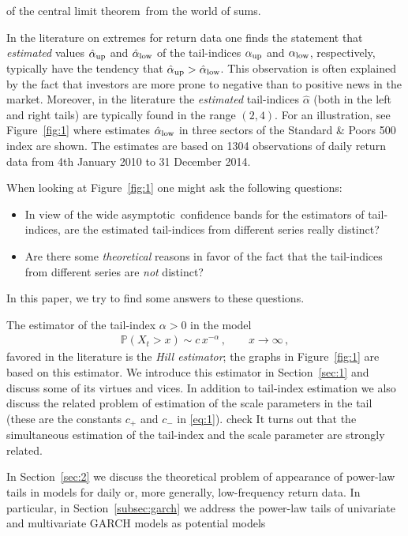 \documentclass[11pt,a4]{amsart}
\newcommand{\red}{\color{darkred}}
\newcommand{\clt}{central limit theorem}
\newcommand{\asy}{asymptotic}
\newcommand{\fre}{frequenc}
\newcommand{\beao}{\begin{eqnarray*}}
\newcommand{\eeao}{\end{eqnarray*}\noindent}
\newcommand{\xto}{x\to\infty}
\renewcommand{\P }{{\mathbb P}}
\newcommand{\1}{{\mathbf 1}}
\begin{document}
of the \clt\ from the world of sums.
\par
In the literature on extremes for return data one finds the 
statement that {\em estimated} values $\hat \alpha_{\rm up}$ and $\hat \alpha_{\rm low}$ 
of the tail-indices $\alpha_{\rm up}$ and $\alpha_{\rm low}$,
respectively, typically have the tendency that $\hat \alpha_{\rm
  up}>\hat \alpha_{\rm low}$. 
This observation is often explained by the fact that investors are
more prone to negative than to positive news in the market. 
Moreover, in the literature the {\em estimated} tail-indices $\hat \alpha$ (both in the left and right tails) 
are typically found in the range $(2,4)$. For an illustration, see
Figure~\ref{fig:1} where estimates $\hat \alpha_{\rm low}$ 
in three sectors of the Standard \& Poors 500 index  are shown. The
estimates are based on 1304 observations of daily return 
data from 4th January 2010 to 31 December 2014.
\par
When looking at Figure~\ref{fig:1} one might ask the following questions:
\begin{itemize}
\item
In view of the wide \asy\ confidence bands for the estimators of tail-indices, 
are the estimated tail-indices from different series really distinct?
\item
Are there some {\em theoretical} reasons in favor of the fact that the tail-indices from different series are {\em not} 
distinct?
\end{itemize}
In this paper, we try to find some answers to these questions. 
\par
The estimator of the tail-index $\alpha>0$  in the model
\beao
\P(X_t>x)\sim c\,x^{-\alpha}\,,\qquad \xto\,,
\eeao
favored in the literature  is the {\em Hill estimator}; the graphs in 
Figure~\ref{fig:1} are based on this estimator. We introduce this estimator in Section~\ref{sec:1} and discuss 
some of its virtues and vices. In addition to tail-index estimation we also discuss the related problem of
estimation of the scale parameters in the tail (these are the constants $c_+$ and $c_-$ in \eqref{eq:1}). {\red check} It turns out 
that the simultaneous estimation of the tail-index and the scale parameter are strongly related.
\par
In Section~\ref{sec:2} we discuss the theoretical problem of appearance of power-law tails in models 
for daily or, more generally, low-\fre y 
return data. In particular, in Section~\ref{subsec:garch} we address the power-law tails of univariate and multivariate GARCH models as potential models
\end{document}
